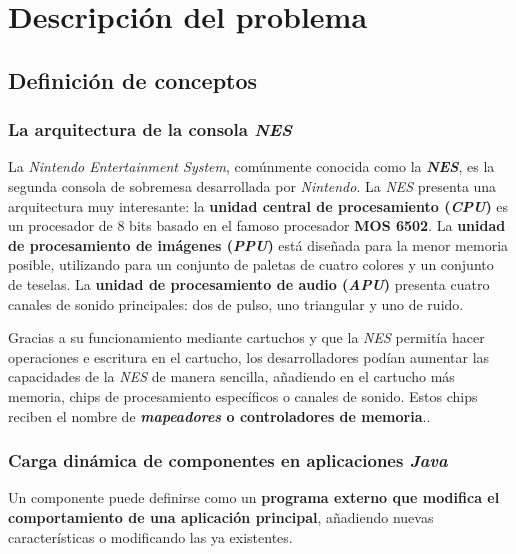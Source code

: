 \chapter{Descripción del problema} \label{ch:descripcion-del-problema}


\section{Definición de conceptos}\label{sec:definicion-de-conceptos}

\subsection{La arquitectura de la consola \textit{NES}}\label{subsec:la-arquitectura-mips}

La \textit{Nintendo Entertainment System}\cite{NES}, comúnmente conocida como
la \textbf{\textit{NES}}, es la segunda consola de sobremesa desarrollada por
\textit{Nintendo}.
La \textit{NES} presenta una arquitectura muy interesante:
la \textbf{unidad central de procesamiento (\textit{CPU})} es un procesador
de 8 bits basado en el famoso procesador \textbf{MOS 6502}\cite{MOS6502}.
La \textbf{unidad de procesamiento de imágenes (\textit{PPU})}\cite{PPU} está
diseñada para  la menor memoria posible, utilizando para
 un conjunto de paletas de cuatro colores y un conjunto
de teselas.
La \textbf{unidad de procesamiento de audio (\textit{APU})}\cite{APU} presenta
cuatro canales de sonido principales: dos de pulso, uno triangular
y uno de ruido.

Gracias a su funcionamiento mediante cartuchos y que la
\textit{NES} permitía hacer operaciones e escritura en el cartucho,
los desarrolladores podían aumentar las capacidades de la \textit{NES} de manera sencilla,
añadiendo en el cartucho más memoria, chips de procesamiento específicos
o canales de sonido.
Estos chips reciben el nombre de \textbf{\textit{mapeadores}
o controladores de memoria}.\cite{MAPPERS}.

\subsection{Carga dinámica de componentes en aplicaciones \textit{Java}}
\label{subsec:carga-dinamica-de-componentes-en-aplicaciones-java}

Un componente puede definirse como un \textbf{programa externo que modifica
el comportamiento de una aplicación principal}, añadiendo nuevas
características o modificando las ya existentes.

